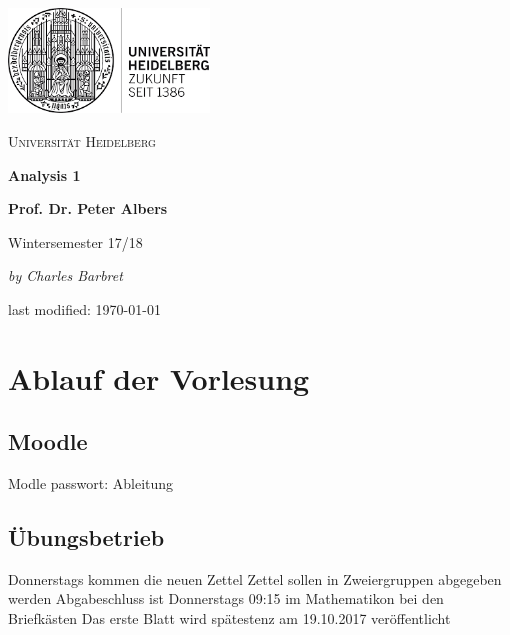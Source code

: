 \documentclass[12pt,a4paper]{article} %
\begin{document}
	\begin{titlepage} %
		\centering
		\includegraphics[width=0.40\textwidth]{UniLogo}\par\vspace{1cm}
		{\scshape\LARGE Universität Heidelberg \par}
		\vspace{1cm}
		{\Huge\bfseries Analysis 1 \par}
		\vspace{1cm}
		{\LARGE\bfseries Prof. Dr. Peter Albers \par}
		\vspace{1cm}
		{\huge Wintersemester 17/18 \par}
		\vspace{2cm}
		{\Large\itshape by Charles Barbret \par}
		
		\vfill
		
		{\large last modified: \gerDate\today\par}
	\end{titlepage}
	
	\tableofcontents %
	\newpage %
	\setcounter{section}{-1}
	\section{Ablauf der Vorlesung}
	\subsection{Moodle}
	Modle passwort: Ableitung
	\subsection{Übungsbetrieb}
	Donnerstags kommen die neuen Zettel \newline
	Zettel sollen in Zweiergruppen abgegeben werden \newline
	Abgabeschluss ist Donnerstags 09:15 im Mathematikon bei den Briefkästen \newline
	Das erste Blatt wird spätestenz am 19.10.2017 veröffentlicht 
	
\end{document}
